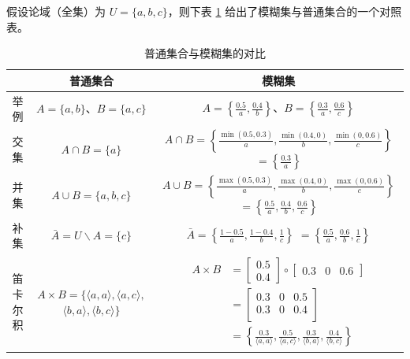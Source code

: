 \documentclass[UTF8]{ctexart}
\newcommand\relation[2]{\langle #1 , #2 \rangle}
\begin{document}
假设论域（全集）为 $U=\{a,b,c\}$，则下表 \ref{tab:fuzzy-set} 给出了模糊集与普通集合的一个对照表。
\begin{table}[htb]
  \centering
  \begin{tabular}{|c|c|c|}
    \hline
    & 普通集合 & 模糊集 \\
    \hline
    举例 & $A=\{a,b\}$、$B=\{a,c\}$ & $A=\left\{\frac{0.5}{a},\frac{0.4}{b}\right\}$、$B=\left\{\frac{0.3}{a},\frac{0.6}{c}\right\}$ \\
    \hline
    交集 & $A\cap B=\{a\}$ & \makecell{$A\cap B=\left\{\frac{\min(0.5,0.3)}{a},\frac{\min(0.4,0)}{b},\frac{\min(0,0.6)}{c}\right\} $ \\
    $= \left\{\frac{0.3}{a}\right\}$} \\
    \hline
    并集 & $A\cup B=\{a,b,c\}$ & \makecell{$A\cup B=\left\{\frac{\max(0.5,0.3)}{a},\frac{\max(0.4,0)}{b},\frac{\max(0,0.6)}{c}\right\} $ \\ $= \left\{\frac{0.5}{a}, \frac{0.4}{b}, \frac{0.6}{c}\right\}$} \\
    \hline
    补集 & $\bar{A} = U\backslash A = \{c\}$ & \makecell{$\bar{A} = \left\{\frac{1-0.5}{a},\frac{1-0.4}{b}, \frac{1}{c}\right\}$ \\ $=\left\{\frac{0.5}{a},\frac{0.6}{b},\frac{1}{c}\right\}$} \\
    \hline
    \makecell{笛卡\\尔积} & \makecell{$A\times B = \{\relation{a}{a}, \relation{a}{c}, $ \\ $\relation{b}{a}, \relation{b}{c}\}$} & $\begin{aligned}
        A\times B &= \begin{bmatrix}
                       0.5 \\ 0.4
                     \end{bmatrix}\circ \begin{bmatrix} 0.3 &  0 & 0.6\end{bmatrix} \\
        &= \begin{bmatrix}
             0.3 & 0 & 0.5 \\
             0.3 & 0 & 0.4 \\
           \end{bmatrix} \\
        &=\left\{\frac{0.3}{\relation{a}{a}},\frac{0.5}{\relation{a}{c}}, \frac{0.3}{\relation{b}{a}}, \frac{0.4}{\relation{b}{c}}\right\}
    \end{aligned}$\\
    \hline
  \end{tabular}
  \caption{普通集合与模糊集的对比}\label{tab:fuzzy-set}
\end{table}
\end{document}
